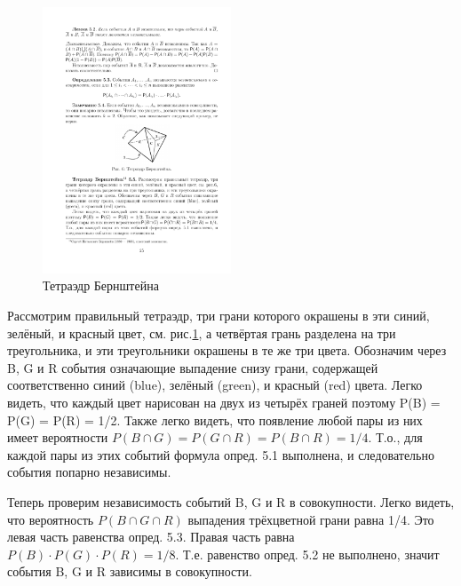 \begin{figure}[H]
	\centering
	\includegraphics[width=0.5\textwidth]{pic/pic6.pdf}
	\caption{Тетраэдр Бернштейна}
	\label{pic:6}
\end{figure}
\begin{theorem}
\end{theorem}
	Рассмотрим правильный тетраэдр, три
грани которого окрашены в эти синий, зелёный, и красный цвет, см. рис.\ref{pic:6},
а четвёртая грань разделена на три треугольника, и эти треугольники окрашены в те же три цвета. Обозначим через B, G и R события означающие
выпадение снизу грани, содержащей соответственно синий (blue), зелёный
(green), и красный (red) цвета.
Легко видеть, что каждый цвет нарисован на двух из четырёх граней
поэтому P(B) = P(G) = P(R) = 1/2. Также легко видеть, что появление
любой пары из них имеет вероятности $P(B\cap G) = P(G\cap R) = P(B\cap R) = 1/4$.
Т.о., для каждой пары из этих событий формула опред. 5.1 выполнена, и
следовательно события попарно независимы.

Теперь проверим независимость событий B, G и R в совокупности. Легко
видеть, что вероятность $P(B \cap  G \cap  R)$ выпадения трёхцветной грани равна
1/4. Это левая часть равенства опред. 5.3. Правая часть равна $P(B) \cdot P(G) \cdot
P(R) = 1/8$. Т.е. равенство опред. 5.2 не выполнено, значит события B, G
и R зависимы в совокупности.



